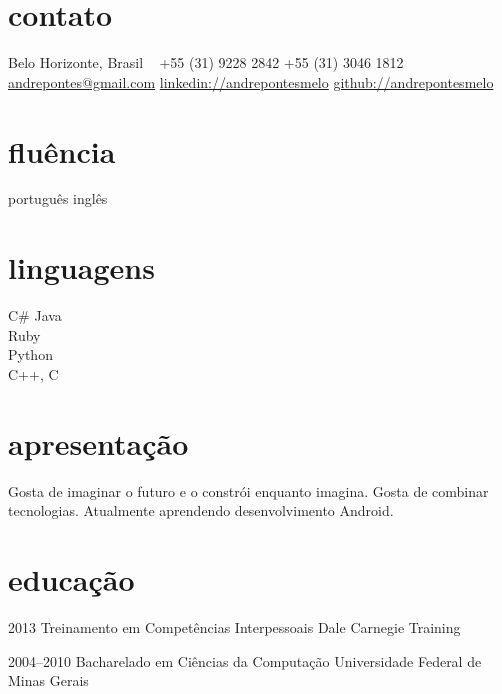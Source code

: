 \documentclass[]{friggeri-cv}
\begin{document}


\begin{aside} 
\section{contato}
Belo Horizonte, Brasil
~
+55 (31) 9228 2842
+55 (31) 3046 1812
~
\href{mailto:andrepontes@gmail.com}{andrepontes@gmail.com}
\href{https://br.linkedin.com/in/andrepontesmelo}{linkedin://andrepontesmelo}
\href{https://github.com/andrepontesmelo}{github://andrepontesmelo}
\section{fluência}
português
inglês 
\section{linguagens}
C\#
Java\\Ruby\\Python\\C++, C
\end{aside}

\section{apresentação}
Gosta de imaginar o futuro e o constrói enquanto imagina. Gosta de combinar tecnologias. 
Atualmente aprendendo desenvolvimento Android.

\section{educação}


\begin{entrylist}

\entry
{2013}
{{\normalfont Treinamento em} Competências Interpessoais}
{Dale Carnegie Training}

\entry
{2004--2010}
{{\normalfont Bacharelado em} Ciências da Computação}
{Universidade Federal de Minas Gerais}

\end{entrylist}
\end{document}
